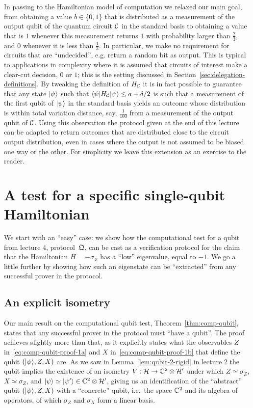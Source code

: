 \begin{remark}
In passing to the Hamiltonian model of computation we relaxed our main goal,  from obtaining a value $b \in \{0,1\}$ that is distributed as a measurement of the output qubit of the quantum circuit $\mathcal{C}$ in the standard basis to obtaining a value that is $1$ whenever this measurement returns $1$ with probability larger than $\frac{2}{3}$, and $0$ whenever it is less than $\frac{1}{3}$. In particular, we make no requirement for circuits that are ``undecided'', e.g. return a random bit as output. This is typical to applications in complexity where it is assumed that circuits of interest make a clear-cut decision, $0$ or $1$; this is the setting discussed in Section~\ref{sec:delegation-definitions}. By tweaking the definition of $H_{\mathcal{C}}$ it is in fact possible to guarantee that any state $|\psi\rangle$ such that $\langle\psi| H_{\mathcal{C}} |\psi\rangle \leq a + \delta/2$ is such that a measurement of the first qubit of $|\psi\rangle$ in the standard basis yields an outcome whose distribution is within total variation distance, say, $\frac{1}{100}$ from a measurement of the output qubit of $\mathcal{C}$. Using this observation the protocol given at the end of this lecture can be adapted to return outcomes that are distributed close to the circuit output distribution, even in cases where the output is not assumed to be biased one way or the other. For simplicity we leave this extension as an exercise to the reader. 
\end{remark}


\section{A test for a specific single-qubit Hamiltonian}

We start with an ``easy'' case: we show how the computational test for a qubit from lecture 4, protocol~$\mathfrak{Q}$, can be cast as a verification protocol for the claim that the Hamiltonian $H=-\sigma_Z$ has a ``low'' eigenvalue, equal to $-1$. We go a little further by showing how such an eigenstate can be ``extracted'' from any successful prover in the protocol. 

\subsection{An explicit isometry}
\label{sec:explicit-iso}

Our main result on the computational qubit test, Theorem~\ref{thm:comp-qubit}, states that any successful prover in the protocol must ``have a qubit''. The proof achieves slightly more than that, as it explicitly states what the observables $Z$ in~\eqref{eq:comp-qubit-proof-1a} and $X$ in~\eqref{eq:comp-qubit-proof-1b}  that define the qubit $(|\psi\rangle,Z,X)$ are. As we saw in Lemma~\ref{lem:qubit-2-rigid} in lecture 2 the qubit implies the existence of an isometry $V:\mathcal{H}\to \mathbb{C}^2\otimes \mathcal{H}'$ under which $Z\simeq \sigma_Z$, $X\simeq \sigma_Z$, and $|\psi\rangle\simeq |\psi'\rangle \in \mathbb{C}^2 \otimes \mathcal{H}'$, giving us an identification of the ``abstract'' qubit $(|\psi\rangle,Z,X)$ with a ``concrete'' qubit, i.e.\ the space $\mathbb{C}^2$ and its algebra of operators, of which $\sigma_Z$ and $\sigma_X$ form a linear basis. 

